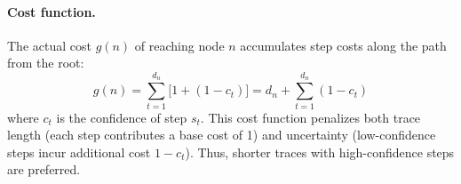 \documentclass[11pt]{article}
\begin{document}
\paragraph{Cost function.} The actual cost $g(n)$ of reaching node $n$ accumulates step costs along the path from the root:
\begin{equation}
g(n) = \sum_{t=1}^{d_n} \big[1 + (1 - c_t)\big] = d_n + \sum_{t=1}^{d_n} (1 - c_t)
\label{eq:gcost}
\end{equation}
where $c_t$ is the confidence of step $s_t$. This cost function penalizes both trace length (each step contributes a base cost of 1) and uncertainty (low-confidence steps incur additional cost $1 - c_t$). Thus, shorter traces with high-confidence steps are preferred.



\end{document}
